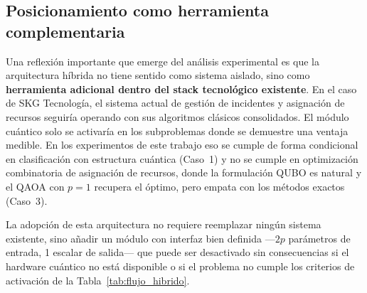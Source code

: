 \subsection{Posicionamiento como herramienta complementaria}

Una reflexión importante que emerge del análisis experimental es que la arquitectura híbrida no tiene sentido como sistema aislado, sino como \textbf{herramienta adicional dentro del stack tecnológico existente}. En el caso de SKG Tecnología, el sistema actual de gestión de incidentes y asignación de recursos seguiría operando con sus algoritmos clásicos consolidados. El módulo cuántico solo se activaría en los subproblemas donde se demuestre una ventaja medible. En los experimentos de este trabajo eso se cumple de forma condicional en clasificación con estructura cuántica (Caso~1) y no se cumple en optimización combinatoria de asignación de recursos, donde la formulación QUBO es natural y el QAOA con $p=1$ recupera el óptimo, pero empata con los métodos exactos (Caso~3).

La adopción de esta arquitectura no requiere reemplazar ningún sistema existente, sino añadir un módulo con interfaz bien definida ---$2p$ parámetros de entrada, 1 escalar de salida--- que puede ser desactivado sin consecuencias si el hardware cuántico no está disponible o si el problema no cumple los criterios de activación de la Tabla~\ref{tab:flujo_hibrido}.
